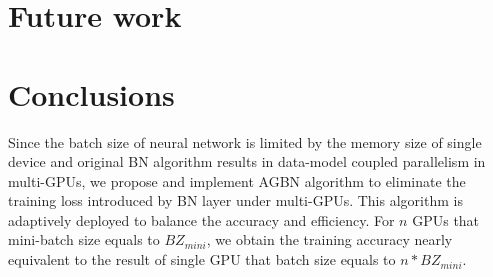 
\section{Future work}

\section{Conclusions}



Since the batch size of neural network is limited by the memory size of single device and original BN algorithm results in data-model coupled parallelism in multi-GPUs, we propose and implement AGBN algorithm to eliminate the training loss introduced by BN layer under multi-GPUs. This algorithm is adaptively deployed to balance the accuracy and efficiency. For $n$ GPUs that mini-batch size equals to $BZ_{mini}$, we obtain the training accuracy  nearly equivalent to the result of single GPU that batch size equals to $n*BZ_{mini}$.



